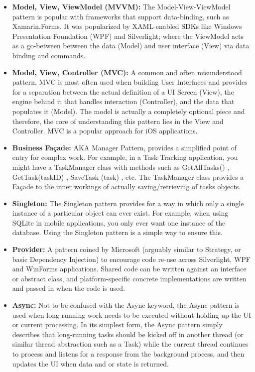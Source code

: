 \begin{itemize}
\item \textbf{Model, View, ViewModel (MVVM):}  The Model-View-ViewModel pattern is popular with frameworks that support data-binding, such as Xamarin.Forms. It was popularized by XAML-enabled SDKs like Windows Presentation Foundation (WPF) and Silverlight; where the ViewModel acts as a go-between between the data (Model) and user interface (View) via data binding and commands.
\item \textbf{Model, View, Controller (MVC):}   A common and often misunderstood pattern, MVC is most often used when building User Interfaces and provides for a separation between the actual definition of a UI Screen (View), the engine behind it that handles interaction (Controller), and the data that populates it (Model). The model is actually a completely optional piece and therefore, the core of understanding this pattern lies in the View and Controller. MVC is a popular approach for iOS applications.
\item \textbf{Business Façade:}    AKA Manager Pattern, provides a simplified point of entry for complex work. For example, in a Task Tracking application, you might have a TaskManager class with methods such as GetAllTasks() , GetTask(taskID) , SaveTask (task) , etc. The TaskManager class provides a Façade to the inner workings of actually saving/retrieving of tasks objects.
\item \textbf{Singleton:}   The Singleton pattern provides for a way in which only a single instance of a particular object can ever exist. For example, when using SQLite in mobile applications, you only ever want one instance of the database. Using the Singleton pattern is a simple way to ensure this.
\item \textbf{Provider:}    A pattern coined by Microsoft (arguably similar to Strategy, or basic Dependency Injection) to encourage code re-use across Silverlight, WPF and WinForms applications. Shared code can be written against an interface or abstract class, and platform-specific concrete implementations are written and passed in when the code is used.
\item \textbf{Async:}   Not to be confused with the Async keyword, the Async pattern is used when long-running work needs to be executed without holding up the UI or current processing. In its simplest form, the Async pattern simply describes that long-running tasks should be kicked off in another thread (or similar thread abstraction such as a Task) while the current thread continues to process and listens for a response from the background process, and then updates the UI when data and or state is returned.

\end{itemize}


